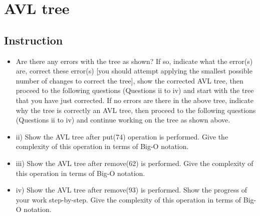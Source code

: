 \section{AVL tree}

\subsection{Instruction}
\begin{itemize}
    \item 
Are there any errors with the tree as shown? If so, indicate what the error(s) are, correct
these error(s) [you should attempt applying the smallest possible number of changes to
correct the tree], show the corrected AVL tree, then proceed to the following questions
(Questions ii to iv) and start with the tree that you have just corrected. If no errors are
there in the above tree, indicate why the tree is correctly an AVL tree, then proceed to
the following questions (Questions ii to iv) and continue working on the tree as shown
above.
\item ii) Show the AVL tree after put(74) operation is performed. Give the complexity of this
operation in terms of Big-O notation.
\item iii) Show the AVL tree after remove(62) is performed. Give the complexity of this
operation in terms of Big-O notation.
\item iv) Show the AVL tree after remove(93) is performed. Show the progress of your work
step-by-step. Give the complexity of this operation in terms of Big-O notation.
\end{itemize}


